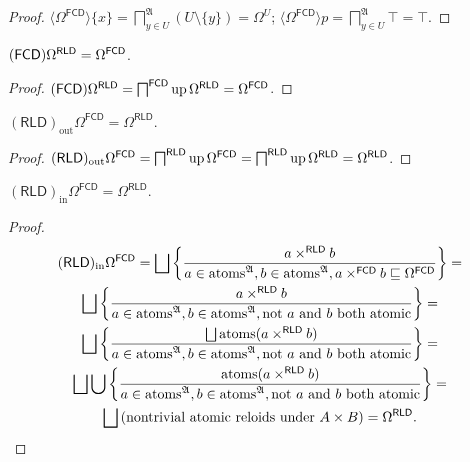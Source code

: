 \begin{proof}
  $\langle \Omega^{\mathsf{FCD}} \rangle \{ x \} =
  \bigsqcap^{\mathfrak{A}}_{y \in U} (U \setminus \{ y \}) = \Omega^U$;
  $\langle \Omega^{\mathsf{FCD}} \rangle p = \bigsqcap^{\mathfrak{A}}_{y
  \in U} \top = \top$.
\end{proof}

\begin{prop}
  $(\mathsf{FCD}) \Omega^{\mathsf{RLD}} =
  \Omega^{\mathsf{FCD}}$.
\end{prop}

\begin{proof}
  $(\mathsf{FCD}) \Omega^{\mathsf{RLD}} =
  \bigsqcap^{\mathsf{FCD}} \operatorname{up} \Omega^{\mathsf{RLD}} =
  \Omega^{\mathsf{FCD}}$.
\end{proof}

\begin{prop}
  $(\mathsf{RLD})_{\operatorname{out}} \Omega^{\mathsf{FCD}} =
  \Omega^{\mathsf{RLD}}$.
\end{prop}

\begin{proof}
  $(\mathsf{RLD})_{\operatorname{out}} \Omega^{\mathsf{FCD}} =
  \bigsqcap^{\mathsf{RLD}} \operatorname{up} \Omega^{\mathsf{FCD}} =
  \bigsqcap^{\mathsf{RLD}} \operatorname{up} \Omega^{\mathsf{RLD}} =
  \Omega^{\mathsf{RLD}}$.
\end{proof}

\begin{prop}
  $(\mathsf{RLD})_{\operatorname{in}} \Omega^{\mathsf{FCD}} = \Omega^{\mathsf{RLD}}$.
\end{prop}

\begin{proof}
  \begin{multline*}
  (\mathsf{RLD})_{\operatorname{in}} \Omega^{\mathsf{FCD}} = \bigsqcup
  \setcond{ a \times^{\mathsf{RLD}} b }{ a \in
  \atoms^{\mathfrak{A}}, b \in \atoms^{\mathfrak{A}}, a
  \times^{\mathsf{FCD}} b \sqsubseteq \Omega^{\mathsf{FCD}}
  } = \\
  \bigsqcup \setcond{ a \times^{\mathsf{RLD}} b }{
  a \in \atoms^{\mathfrak{A}}, b \in
  \atoms^{\mathfrak{A}}, \text{not $a$ and $b$ both atomic} } = \\
  \bigsqcup \setcond{ \bigsqcup \atoms (a \times^{\mathsf{RLD}} b)
  }{ a \in \atoms^{\mathfrak{A}}, b \in
  \atoms^{\mathfrak{A}}, \text{not $a$ and $b$ both atomic} } = \\
  \bigsqcup \bigcup \setcond{ \atoms (a \times^{\mathsf{RLD}} b) }{
  a \in \atoms^{\mathfrak{A}}, b \in
  \atoms^{\mathfrak{A}}, \text{not $a$ and $b$ both atomic} } = \\
  \bigsqcup \left( \text{nontrivial atomic reloids under $A \times B$} \right) =
  \Omega^{\mathsf{RLD}}.
  \end{multline*}
\end{proof}
